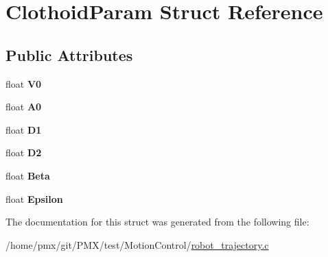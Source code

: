 \hypertarget{structClothoidParam}{}\section{Clothoid\+Param Struct Reference}
\label{structClothoidParam}
\subsection*{Public Attributes}
\begin{DoxyCompactItemize}
\item 
\mbox{\label{structClothoidParam_a9d5fed0ae23663fa2a5108f0838fbcdd}} 
float {\bfseries V0}
\item 
\mbox{\label{structClothoidParam_a87baf3874b01b89fcb8e58e5c1d87627}} 
float {\bfseries A0}
\item 
\mbox{\label{structClothoidParam_a3280a559d4d0bdd7b2ad186c2297052f}} 
float {\bfseries D1}
\item 
\mbox{\label{structClothoidParam_a66b66547274c1c3317856d07840f13b3}} 
float {\bfseries D2}
\item 
\mbox{\label{structClothoidParam_ae2558ee0efaea14cc8c0356a8571e5ef}} 
float {\bfseries Beta}
\item 
\mbox{\label{structClothoidParam_a702649aabfc290873ac91f10ba586de7}} 
float {\bfseries Epsilon}
\end{DoxyCompactItemize}


The documentation for this struct was generated from the following file\+:\begin{DoxyCompactItemize}
\item 
/home/pmx/git/\+P\+M\+X/test/\+Motion\+Control/\hyperlink{robot__trajectory_8c}{robot\+\_\+trajectory.\+c}\end{DoxyCompactItemize}
